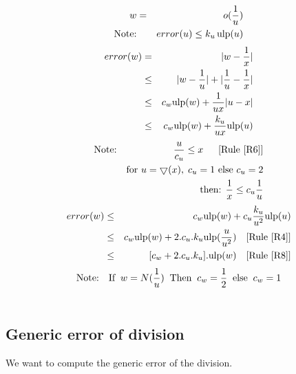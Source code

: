 \documentclass[12pt]{amsart}
\def\n{\textnormal}
\def\minf{\bigtriangledown}
\def\ulp{{\rm ulp}}
\newcommand{\U}[1]{\quad \mbox{[Rule~\ref{#1}]}}
\begin{document}
\begin{eqnarray}\nonumber
w&=&o(\frac{1}{u}) \\\nonumber
\textnormal{Note:}&& error(u) \leq k_u \, \ulp(u)
\end{eqnarray}
\begin{eqnarray}\nonumber
error(w)& = &|w - \frac{1}{x}| \\\nonumber
& \leq &|w - \frac{1}{u}| +|\frac{1}{u} - \frac{1}{x}| \\\nonumber
& \leq & c_w \ulp(w) + \frac{1}{ux}|u-x| \\\nonumber
& \leq & c_w \ulp(w) + \frac{k_u}{ux} \ulp(u)
\end{eqnarray}
\begin{eqnarray}\nonumber
\textnormal{Note:}&& \frac{u}{c_u} \leq x\;\; \U{R6}\\\nonumber
&&\n{for } u=\minf(x),\;c_u=1 \n{ else } c_u=2\\\nonumber
&& \n{then: } \frac{1}{x} \leq c_u \frac{1}{u} 
\end{eqnarray}
\begin{eqnarray}\nonumber
error(w)& \leq & c_w \ulp(w) + c_u\frac{k_u}{u^2} \ulp(u)\\\nonumber
& \leq & c_w \ulp(w) + 2.c_u.k_u \ulp(\frac{u}{u^2}) \U{R4}\\\nonumber
& \leq & [c_w + 2.c_u.k_u].\ulp(w) \U{R8}
\end{eqnarray}
\begin{eqnarray}\nonumber
\textnormal{Note:}&&\textnormal{If}\;\; w=N(\frac{1}{u}) \;\;\textnormal{Then}\;\; c_w =\frac{1}{2} \;\;\textnormal{else}\;\; c_w =1\\\nonumber\end{eqnarray}

\subsection{Generic error of division}\label{generic:div}


We want to compute the generic error of the division.
\end{document}
